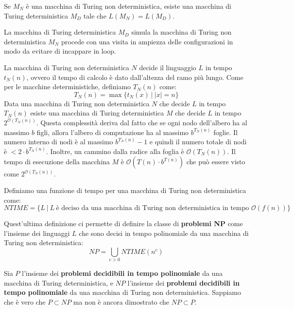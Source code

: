 \begin{teorema}
    Se $M_N$ è una macchina di Turing non deterministica, esiste una macchina di
    Turing deterministica $M_D$ tale che $L(M_N) = L(M_D)$.
\end{teorema}
\begin{dimostrazione}
    La macchina di Turing deterministica $M_D$ simula la macchina di Turing non
    deterministica $M_N$ procede con una visita in ampiezza delle configurazioni
    in modo da evitare di incappare in loop.
\end{dimostrazione}
La macchina di Turing non deterministica $N$ decide il linguaggio $L$ in tempo
$t_N(n)$, ovvero il tempo di calcolo è dato dall'altezza del ramo più lungo.
Come per le macchine deterministiche, definiamo $T_N(n)$ come:
\begin{equation}
    T_N(n) = \max \{t_N(x) \ | \ |x| = n\}
\end{equation}
Data una macchina di Turing non deterministica $N$ che decide $L$ in tempo $T_N(n)$
esiste una macchina di Turing deterministica $M$ che decide $L$ in tempo
$2^{\mathcal{O}(T_N(n))}$. Questa complessità deriva dal fatto che se ogni nodo
dell'albero ha al massimo $b$ figli, allora l'albero di computazione ha al massimo
$b^{T_N(n)}$ foglie. Il numero interno di nodi è al massimo $b^{T_N(n)} - 1$ e
quindi il numero totale di nodi è $< 2 \cdot b^{T_N(n)}$. Inoltre, un cammino
dalla radice alla foglia è $\mathcal{O}(T_N(n))$. Il tempo di esecuzione della
macchina $M$ è $\mathcal{O}(T(n) \cdot b^{T(n)})$ che può essere visto come
$2^{\mathcal{O}(T_N(n))}$.
\begin{definizione}
    Definiamo una funzione di tempo per una macchina di Turing non deterministica come:
    \begin{equation}
        NTIME = \{L \ | \ L \ \text{è deciso da una macchina di Turing non deterministica in tempo } \mathcal{O}(f(n))\}
    \end{equation}
\end{definizione}
Quest'ultima definizione ci permette di definire la classe di \textbf{problemi NP}
come l'insieme dei linguaggi $L$ che sono decisi in tempo polinomiale da una macchina
di Turing non deterministica:
\begin{equation}
    NP = \bigcup_{c > 0} NTIME(n^c)
\end{equation}
\begin{osservazione}
    Sia $P$ l'insieme dei \textbf{problemi decidibili in tempo polinomiale} da una
    macchina di Turing deterministica, e $NP$ l'insieme dei \textbf{problemi decidibili in tempo polinomiale}
    da una macchina di Turing non deterministica. Sappiamo che è vero che $P \subset NP$
    ma non è ancora dimostrato che $NP \subset P$.
\end{osservazione}
